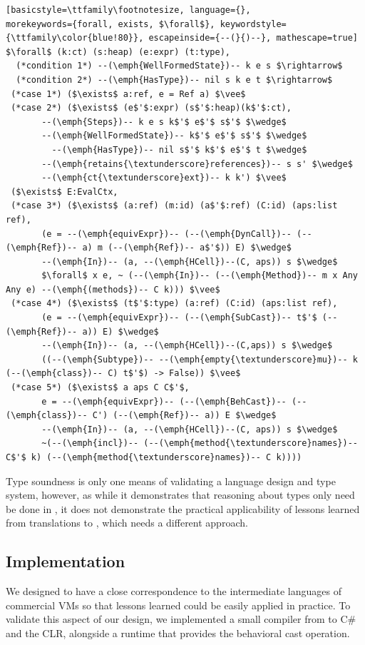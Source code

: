 \documentclass[USenglish]{tex/lipics-v2016}
\begin{document}
\begin{lstlisting}[basicstyle=\ttfamily\footnotesize, language={}, 
morekeywords={forall, exists, $\forall$}, keywordstyle={\ttfamily\color{blue!80}}, escapeinside={--(}{)--}, mathescape=true]
$\forall$ (k:ct) (s:heap) (e:expr) (t:type),
  (*condition 1*) --(\emph{WellFormedState})-- k e s $\rightarrow$ 
  (*condition 2*) --(\emph{HasType})-- nil s k e t $\rightarrow$   
 (*case 1*) ($\exists$ a:ref, e = Ref a) $\vee$
 (*case 2*) ($\exists$ (e$'$:expr) (s$'$:heap)(k$'$:ct), 
       --(\emph{Steps})-- k e s k$'$ e$'$ s$'$ $\wedge$
       --(\emph{WellFormedState})-- k$'$ e$'$ s$'$ $\wedge$
	     --(\emph{HasType})-- nil s$'$ k$'$ e$'$ t $\wedge$
       --(\emph{retains{\textunderscore}references})-- s s' $\wedge$
       --(\emph{ct{\textunderscore}ext})-- k k') $\vee$
 ($\exists$ E:EvalCtx,
 (*case 3*) ($\exists$ (a:ref) (m:id) (a$'$:ref) (C:id) (aps:list ref),
       (e = --(\emph{equivExpr})-- (--(\emph{DynCall})-- (--(\emph{Ref})-- a) m (--(\emph{Ref})-- a$'$)) E) $\wedge$
       --(\emph{In})-- (a, --(\emph{HCell})--(C, aps)) s $\wedge$
       $\forall$ x e, ~ (--(\emph{In})-- (--(\emph{Method})-- m x Any Any e) --(\emph{(methods})-- C k))) $\vee$
 (*case 4*) ($\exists$ (t$'$:type) (a:ref) (C:id) (aps:list ref),
       (e = --(\emph{equivExpr})-- (--(\emph{SubCast})-- t$'$ (--(\emph{Ref})-- a)) E) $\wedge$
       --(\emph{In})-- (a, --(\emph{HCell})--(C,aps)) s $\wedge$
       ((--(\emph{Subtype})-- --(\emph{empty{\textunderscore}mu})-- k (--(\emph{class})-- C) t$'$) -> False)) $\vee$
 (*case 5*) ($\exists$ a aps C C$'$, 
       e = --(\emph{equivExpr})-- (--(\emph{BehCast})-- (--(\emph{class})-- C') (--(\emph{Ref})-- a)) E $\wedge$
       --(\emph{In})-- (a, --(\emph{HCell})--(C, aps)) s $\wedge$
       ~(--(\emph{incl})-- (--(\emph{method{\textunderscore}names})-- C$'$ k) (--(\emph{method{\textunderscore}names})-- C k))))
\end{lstlisting}

Type soundness is only one means of validating a language design and type
system, however, as while it demonstrates that reasoning about types only need
be done in \kafka, it does not demonstrate the practical applicability of 
lessons learned from translations to \kafka, which needs a different approach.

\subsection{Implementation} We designed \kafka to have a close correspondence
to the intermediate languages of commercial VMs so that lessons learned could
be easily applied in practice. To validate this aspect of our design, we
implemented a small compiler from \kafka to C\# and the CLR, alongside a
runtime that provides the behavioral cast operation.
\end{document}
